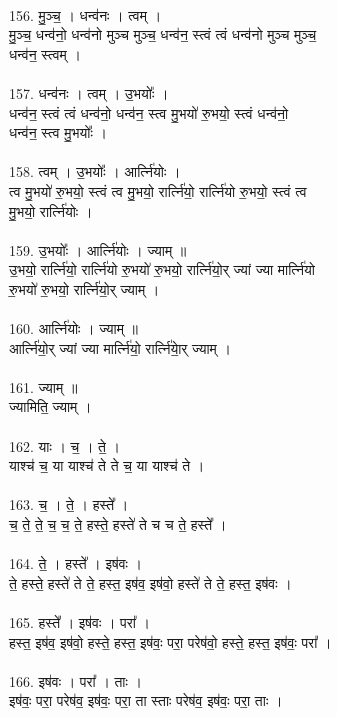 \\
156. मु॒ञ्च॒ । धन्व॑नः । त्वम् ।\\
मु॒ञ्च॒ धन्व॑नो॒ धन्व॑नो मुञ्च मुञ्च॒ धन्व॑न॒ स्त्वं त्वं धन्व॑नो मुञ्च मुञ्च॒\\
धन्व॑न॒ स्त्वम् ।\\
\\
157. धन्व॑नः । त्वम् । उ॒भयोः᳚ ।\\
धन्व॑न॒ स्त्वं त्वं धन्व॑नो॒ धन्व॑न॒ स्त्व मु॒भयो॑ रु॒भयो॒ स्त्वं धन्व॑नो॒\\
धन्व॑न॒ स्त्व मु॒भयोः᳚ ।\\
\\
158. त्वम् । उ॒भयोः᳚ । आर्त्नि॑योः ।\\
त्व मु॒भयो॑ रु॒भयो॒ स्त्वं त्व मु॒भयो॒ रार्त्नि॑यो॒ रार्त्नि॑यो रु॒भयो॒ स्त्वं त्व\\
मु॒भयो॒ रार्त्नि॑योः ।\\
\\
159. उ॒भयोः᳚ । आर्त्नि॑योः । ज्याम् ॥\\
उ॒भयो॒ रार्त्नि॑यो॒ रार्त्नि॑यो रु॒भयो॑ रु॒भयो॒ रार्त्नि॑यो॒र् ज्यां ज्या मार्त्नि॑यो\\
रु॒भयो॑ रु॒भयो॒ रार्त्नि॑यो॒र् ज्याम् ।\\
\\
160. आर्त्नि॑योः । ज्याम् ॥\\
आर्त्नि॑यो॒र् ज्यां ज्या मार्त्नि॑यो॒ रार्त्नि॑याे॒र् ज्याम् ।\\
\\
161. ज्याम् ॥\\
ज्यामिति॒ ज्याम् ।\\
\\
162. याः । च॒ । ते॒ ।\\
याश्च॑ च॒ या याश्च॑ ते ते च॒ या याश्च॑ ते ।\\
\\
163. च॒ । ते॒ । हस्ते᳚ ।\\
च॒ ते॒ ते॒ च॒ च॒ ते॒ हस्ते॒ हस्ते॑ ते च च ते॒ हस्ते᳚ ।\\
\\
164. ते॒ । हस्ते᳚ । इष॑वः ।\\
ते॒ हस्ते॒ हस्ते॑ ते ते॒ हस्त॒ इष॑व॒ इष॑वो॒ हस्ते॑ ते ते॒ हस्त॒ इष॑वः ।\\
\\
165. हस्ते᳚ । इष॑वः । परा᳚ ।\\
हस्त॒ इष॑व॒ इष॑वो॒ हस्ते॒ हस्त॒ इष॑वः॒ परा॒ परेष॑वो॒ हस्ते॒ हस्त॒ इष॑वः॒ परा᳚ ।\\
\\
166. इष॑वः । परा᳚ । ताः ।\\
इष॑वः॒ परा॒ परेष॑व॒ इष॑वः॒ परा॒ ता स्ताः परेष॑व॒ इष॑वः॒ परा॒ ताः ।\\
